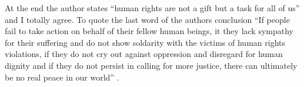 At the end the author states ``human rights are not a gift but a task for
all of us'' \cite[. 37]{tfohr} and I totally agree. To quote the last
word of the authors conclusion ``If people fail to take action on
behalf of their fellow human beings, it they lack sympathy for their
suffering and do not show soldarity with the victims of human rights
violations, if they do not cry out against oppression and disregard for
human dignity and if they do not persist in calling for more justice,
there can ultimately be no real peace in our world'' \cite[p. 37]{tfohr}.
